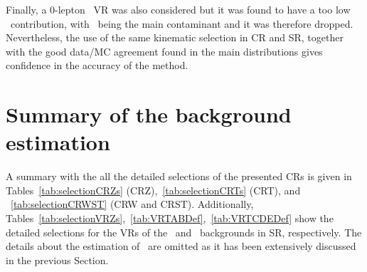 		Finally, a $0$-lepton \ttgamma\ \ac{VR} was also considered but it was found to have a too low \ttgamma\ contribution, with \gammajets\ being the main contaminant and it was therefore dropped. Nevertheless, the use of the same kinematic selection in \ac{CR}  and \ac{SR}, together with the good data/MC agreement found in the main distributions gives confidence in the accuracy of the method.




	\clearpage\section{Summary of the background estimation}

		A summary with the all the detailed selections of the presented \acp{CR} is given in Tables~\ref{tab:selectionCRZs} (CRZ),~\ref{tab:selectionCRTs} (CRT), and ~\ref{tab:selectionCRWST} (CRW and CRST). Additionally, Tables~\ref{tab:selectionVRZs},~\ref{tab:VRTABDef},~\ref{tab:VRTCDEDef} show the detailed selections for the \acp{VR} of the \Zjets\ and \ttbar\ backgrounds in \ac{SR}, respectively. The details about the estimation of \ttZ\ are omitted as it has been extensively discussed in the previous Section. 

